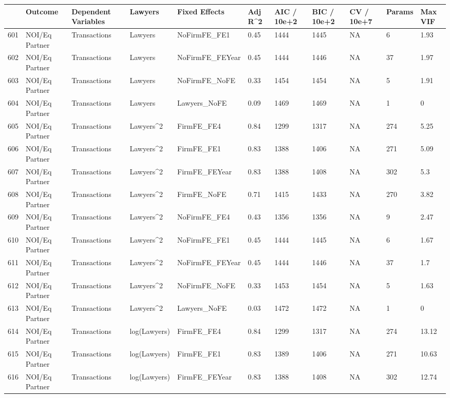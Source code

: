 \documentclass{article}
\begin{document}
\begin{table}[H]
\centering
\begin{tabular}{rllllllllll}
  \hline
 & Outcome & Dependent Variables & Lawyers & Fixed Effects & Adj R^2 & AIC / 10e+2 & BIC / 10e+2 & CV / 10e+7 & Params & Max VIF \\
  \hline
601 & NOI/Eq Partner & Transactions & Lawyers & NoFirmFE\_FE1 & 0.45 & 1444 & 1445 & NA & 6 & 1.93 \\
  602 & NOI/Eq Partner & Transactions & Lawyers & NoFirmFE\_FEYear & 0.45 & 1444 & 1446 & NA & 37 & 1.97 \\
  603 & NOI/Eq Partner & Transactions & Lawyers & NoFirmFE\_NoFE & 0.33 & 1454 & 1454 & NA & 5 & 1.91 \\
  604 & NOI/Eq Partner & Transactions & Lawyers & Lawyers\_NoFE & 0.09 & 1469 & 1469 & NA & 1 & 0 \\
  605 & NOI/Eq Partner & Transactions & Lawyers^2 & FirmFE\_FE4 & 0.84 & 1299 & 1317 & NA & 274 & 5.25 \\
  606 & NOI/Eq Partner & Transactions & Lawyers^2 & FirmFE\_FE1 & 0.83 & 1388 & 1406 & NA & 271 & 5.09 \\
  607 & NOI/Eq Partner & Transactions & Lawyers^2 & FirmFE\_FEYear & 0.83 & 1388 & 1408 & NA & 302 & 5.3 \\
  608 & NOI/Eq Partner & Transactions & Lawyers^2 & FirmFE\_NoFE & 0.71 & 1415 & 1433 & NA & 270 & 3.82 \\
  609 & NOI/Eq Partner & Transactions & Lawyers^2 & NoFirmFE\_FE4 & 0.43 & 1356 & 1356 & NA & 9 & 2.47 \\
  610 & NOI/Eq Partner & Transactions & Lawyers^2 & NoFirmFE\_FE1 & 0.45 & 1444 & 1445 & NA & 6 & 1.67 \\
  611 & NOI/Eq Partner & Transactions & Lawyers^2 & NoFirmFE\_FEYear & 0.45 & 1444 & 1446 & NA & 37 & 1.7 \\
  612 & NOI/Eq Partner & Transactions & Lawyers^2 & NoFirmFE\_NoFE & 0.33 & 1453 & 1454 & NA & 5 & 1.63 \\
  613 & NOI/Eq Partner & Transactions & Lawyers^2 & Lawyers\_NoFE & 0.03 & 1472 & 1472 & NA & 1 & 0 \\
  614 & NOI/Eq Partner & Transactions & log(Lawyers) & FirmFE\_FE4 & 0.84 & 1299 & 1317 & NA & 274 & 13.12 \\
  615 & NOI/Eq Partner & Transactions & log(Lawyers) & FirmFE\_FE1 & 0.83 & 1389 & 1406 & NA & 271 & 10.63 \\
  616 & NOI/Eq Partner & Transactions & log(Lawyers) & FirmFE\_FEYear & 0.83 & 1388 & 1408 & NA & 302 & 12.74 \\

\end{tabular}
\end{table}
\end{document}
